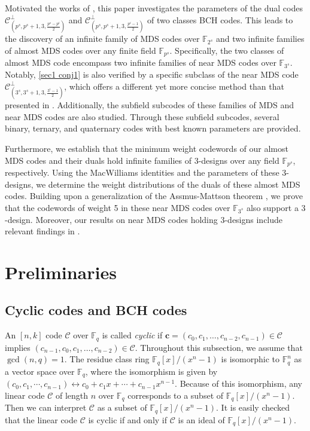 \documentclass[sn-mathphys-num]{sn-jnl}%
\theoremstyle{thmstyleone}%
\theoremstyle{thmstyletwo}%
\theoremstyle{thmstylethree}%
\begin{document}
Motivated the works of \cite{Ding2020InfiniteFamiliesMDS,Geng2022ClassAlmostMDS,Xu2023InfiniteFamiliesMDS}, this paper investigates the parameters of the dual codes $\mathcal{C}^\perp_{(p^s,p^s+1,3,\frac{p^s-p^i}{2})}$ and $\mathcal{C}^\perp_{(p^s,p^s+1,3,\frac{p^i-1}{2})}$ of two classes BCH codes. This leads to the discovery of an infinite family of MDS codes over $\mathbb{F}_{2^s}$ and two infinite families of almost MDS codes over any finite field $\mathbb{F}_{p^s}$. Specifically, the two classes of almost MDS code encompass two infinite families of near MDS codes over $\mathbb{F}_{3^s}$. Notably, \cref{sec1 conj1} is also verified by a specific subclass of the near MDS code $\mathcal{C}^\perp_{(3^s,3^s+1,3,\frac{3^i-1}{2})}$, which offers a different yet more concise method than that presented in \cite{Qiang2024CharacterizationAlmost}. Additionally, the subfield subcodes of these families of MDS and near MDS codes are also studied. Through these subfield subcodes, several binary, ternary, and quaternary codes with best known parameters are provided.

Furthermore, we establish that the minimum weight codewords of our almost MDS codes and their duals hold infinite families of $3$-designs over any field $\mathbb{F}_{p^s}$, respectively. Using the MacWilliams identities and the parameters of these $3$-designs, we determine the weight distributions of the duals of these almost MDS codes. Building upon a generalization of the Assmus-Mattson theorem \cite[Theorem 5.3]{Tang2020CodesDifferentiallyUniform}, we prove that the codewords of weight 5 in these near MDS codes over $\mathbb{F}_{3^s}$ also support a $3$-design. Moreover, our results on near MDS codes holding $3$-designs include relevant findings in \cite[Theorem 21]{Ding2020InfiniteFamiliesMDS}.


\section{Preliminaries}\label{sec2}
\subsection{Cyclic codes and BCH codes}\label{sec2.1}

An $[n,k]$ code $\mathcal{C}$ over $\mathbb{F}_q$ is called \textit{cyclic} if $\mathbf{c}=(c_0,c_1,\dots,c_{n-2},c_{n-1})\in\mathcal{C}$ implies $(c_{n-1},c_0,c_1,\dots,c_{n-2})\in\mathcal{C}$. Throughout this subsection, we assume that $\gcd(n,q)=1$. The residue class ring $\mathbb{F}_q[x]/(x^n-1)$ is isomorphic to $\mathbb{F}_q^n$ as a vector space over $\mathbb{F}_q$, where the isomorphism is given by $(c_0,c_1,\cdots,c_{n-1})\leftrightarrow c_0+c_1x+\cdots+c_{n-1}x^{n-1}$. Because of this isomorphism, any linear code $\mathcal{C}$ of length $n$ over $\mathbb{F}_q$ corresponds to a subset of $\mathbb{F}_q[x]/(x^n-1)$. Then we can interpret $\mathcal{C}$ as a subset of $\mathbb{F}_q[x]/(x^n-1)$. It is easily checked that the linear code $\mathcal{C}$ is cyclic if and only if $\mathcal{C}$ is an ideal of $\mathbb{F}_q[x]/(x^n-1)$.
\end{document}
